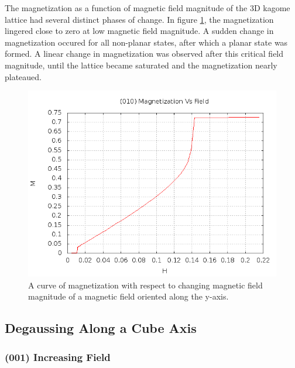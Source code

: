 The magnetization as a function of magnetic field magnitude of the 3D kagome lattice had several distinct phases of change. In figure \ref{fig:magphase}, the magnetization lingered close to zero at low magnetic field magnitude. A sudden change in magnetization occured for all non-planar states, after which a planar state was formed. A linear change in magnetization was observed after this critical field magnitude, until the lattice became saturated and the magnetization nearly plateaued.

\begin{figure}
\includegraphics[scale=0.7]{img/magneticphases.png}
\caption{A curve of magnetization with respect to changing magnetic field magnitude of a magnetic field oriented along the y-axis.}
\label{fig:magphase}
\end{figure}

\subsection{Degaussing Along a Cube Axis}

\subsubsection{(001) Increasing Field}
